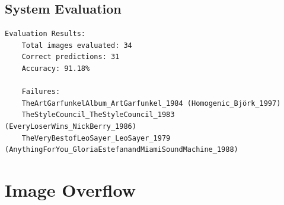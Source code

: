 \begin{uomappendix}
            \subsection{System Evaluation}
    
                \begin{adjustbox}{max width=\textwidth}
                    \begin{lstlisting}[caption={Ouroboros model evaluation results on test set \ref{data:trueTest} (34 images)}, label={lst:ourobEval}]
    Evaluation Results:
    Total images evaluated: 34
    Correct predictions: 31
    Accuracy: 91.18%
    
    Failures:
    TheArtGarfunkelAlbum_ArtGarfunkel_1984 (Homogenic_Björk_1997)
    TheStyleCouncil_TheStyleCouncil_1983 (EveryLoserWins_NickBerry_1986)
    TheVeryBestofLeoSayer_LeoSayer_1979 (AnythingForYou_GloriaEstefanandMiamiSoundMachine_1988)
                    \end{lstlisting}
                \end{adjustbox}
    
        \section{Image Overflow}
    

\end{uomappendix}
